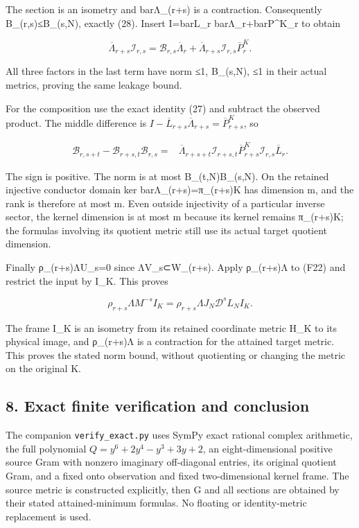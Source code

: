 \documentclass[11pt]{article}
\begin{document}
The section is an isometry and barΛ\_(r+s) is a contraction. Consequently \textbar\textbar B\_(r,s)\textbar\textbar≤B\_(s,N), exactly (28). Insert I=barL\_r barΛ\_r+barP\^{}K\_r to obtain

\[
\overline\Lambda_{r+s}\mathcal I_{r,s}
=\mathcal B_{r,s}\overline\Lambda_r
+\overline\Lambda_{r+s}\mathcal I_{r,s}\overline P^K_r. \tag{F29}
\]

All three factors in the last term have norm ≤1, B\_(s,N), ≤1 in their actual metrics, proving the same leakage bound.

For the composition use the exact identity (27) and subtract the observed product. The middle difference is \(I-\overline L_{r+s}\overline\Lambda_{r+s}=\overline P^K_{r+s}\), so

\[
\begin{aligned}
\mathcal B_{r,s+t}-\mathcal B_{r+s,t}\mathcal B_{r,s}
={}&\overline\Lambda_{r+s+t}\mathcal I_{r+s,t}
\overline P^K_{r+s}\mathcal I_{r,s}\overline L_r.
\end{aligned}\tag{F30}
\]

The sign is positive. The norm is at most B\_(t,N)B\_(s,N). On the retained injective conductor domain ker barΛ\_(r+s)=π\_(r+s)K has dimension m, and the rank is therefore at most m. Even outside injectivity of a particular inverse sector, the kernel dimension is at most m because its kernel remains π\_(r+s)K; the formulas involving its quotient metric still use its actual target quotient dimension.

Finally ρ\_(r+s)ΛU\_s=0 since ΛV\_s⊂W\_(r+s). Apply ρ\_(r+s)Λ to (F22) and restrict the input by I\_K. This proves

\[
\rho_{r+s}\Lambda M^{-s}I_K
=\rho_{r+s}\Lambda J_N\mathscr D^sL_NI_K. \tag{F31}
\]

The frame I\_K is an isometry from its retained coordinate metric H\_K to its physical image, and ρ\_(r+s)Λ is a contraction for the attained target metric. This proves the stated norm bound, without quotienting or changing the metric on the original K.

\subsection{8. Exact finite verification and conclusion}\label{exact-finite-verification-and-conclusion}

The companion \texttt{verify\_exact.py} uses SymPy exact rational complex arithmetic, the full polynomial \(Q=y^6+2y^4-y^3+3y+2\), an eight-dimensional positive source Gram with nonzero imaginary off-diagonal entries, its original quotient Gram, and a fixed onto observation and fixed two-dimensional kernel frame. The source metric is constructed explicitly, then G and all sections are obtained by their stated attained-minimum formulas. No floating or identity-metric replacement is used.
\end{document}
